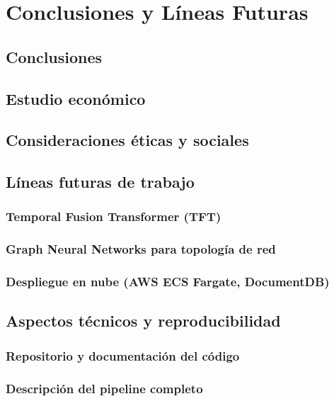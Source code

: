 \documentclass[12pt, a4paper]{article}
\begin{document}
\section{Conclusiones y Líneas Futuras}

\subsection{Conclusiones}
\subsection{Estudio económico}
\subsection{Consideraciones éticas y sociales}
\subsection{Líneas futuras de trabajo}
\subsubsection{Temporal Fusion Transformer (TFT)}
\subsubsection{Graph Neural Networks para topología de red}
\subsubsection{Despliegue en nube (AWS ECS Fargate, DocumentDB)}
\subsection{Aspectos técnicos y reproducibilidad}
\subsubsection{Repositorio y documentación del código}
\subsubsection{Descripción del pipeline completo}
\end{document}
